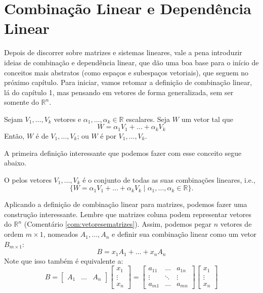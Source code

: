 \documentclass[../main.tex]{subfiles}
\begin{document}
	\section{Combinação Linear e Dependência Linear}
		Depois de discorrer sobre matrizes e sistemas lineares, vale a pena introduzir ideias de combinação e dependência linear, que dão uma boa base para o início de conceitos mais abstratos (como espaços e subespaços vetoriais), que seguem no próximo capítulo. Para iniciar, vamos retomar a definição de combinação linear, lá do capítulo 1, mas pensando em vetores de forma generalizada, sem ser somente do $\mathbb{R}^n$.
		\begin{definicao}
			Sejam $V_1, \dots, V_k $ vetores e $\alpha_1,\dots, \alpha_k \in \mathbb{R}$ escalares. Seja $W$ um vetor tal que
			\[
			W = \alpha_1 V_1 + \dots + \alpha_k V_k 
			\]
			Então, $W$ é  de $V_1, \dots, V_k$; ou $W$ é  por $V_1,\dots,V_k$.
		\end{definicao}
		A primeira definição interessante que podemos fazer com esse conceito segue abaixo. 
		\begin{definicao}
			O  pelos vetores $V_1,\dots,V_k$ é o conjunto de todas as suas combinações lineares, i.e.,
			\[
			\{W= \alpha_1 V_1 + \dots + \alpha_k V_k\mid \alpha_1,\dots,\alpha_k\in \mathbb{R}\}.
			\]
		\end{definicao}
		Aplicando a definição de combinação linear para matrizes, podemos fazer uma construção interessante. Lembre que matrizes coluna podem representar vetores do $\mathbb{R}^n$ (Comentário \ref{com:vetoresematrizes}). Assim, podemos pegar $n$ vetores de ordem $m\times 1$, nomeados $A_{1},\dots,A_{n}$ e definir sua combinação linear como um vetor $B_{m\times 1}$:
		\[
		B=x_1A_1+\dots +x_n A_n
		\]
		Note que isso também é equivalente a:
		\[
		B=\begin{bmatrix}
			A_1 & \dots & A_n
		\end{bmatrix}\begin{bmatrix}
			x_1\\
			\vdots\\
			x_n
		\end{bmatrix}=\begin{bmatrix}
		a_{11} & \dots & a_{1n}\\
		\vdots & \ddots& \vdots\\
		a_{m1} & \dots & a_{mn}
		\end{bmatrix}\begin{bmatrix}
		x_1\\
		\vdots\\
		x_n
		\end{bmatrix}
		\]
\end{document}
